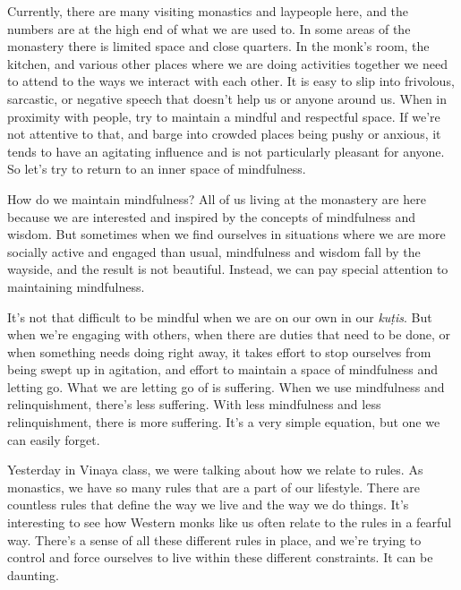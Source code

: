 
Currently, there are many visiting monastics and laypeople here, and 
the numbers are at the high end of what we are used to. In some areas 
of the monastery there is limited space and close quarters. In the 
monk's room, the kitchen, and various other places where we are doing 
activities together we need to attend to the ways we interact with each 
other. It is easy to slip into frivolous, sarcastic, or negative speech 
that doesn't help us or anyone around us. When in proximity with 
people, try to maintain a mindful and respectful space. If we're not 
attentive to that, and barge into crowded places being pushy or 
anxious, it tends to have an agitating influence and is not 
particularly pleasant for anyone. So let's try to return to an inner 
space of mindfulness.

How do we maintain mindfulness? All of us living at the monastery are 
here because we are interested and inspired by the concepts of 
mindfulness and wisdom. But sometimes when we find ourselves in 
situations where we are more socially active and engaged than usual, 
mindfulness and wisdom fall by the wayside, and the result is not 
beautiful. Instead, we can pay special attention to maintaining 
mindfulness.

It's not that difficult to be mindful when we are on our own in our 
\emph{kuṭis}. But when we're engaging with others, when there are 
duties that need to be done, or when something needs doing right away, 
it takes effort to stop ourselves from being swept up in agitation, and 
effort to maintain a space of mindfulness and letting go. What we are 
letting go of is suffering. When we use mindfulness and relinquishment, 
there's less suffering. With less mindfulness and less relinquishment, 
there is more suffering. It's a very simple equation, but one we can 
easily forget.


Yesterday in Vinaya class, we were talking about how we relate to 
rules. As monastics, we have so many rules that are a part of our 
lifestyle. There are countless rules that define the way we live and 
the way we do things. It's interesting to see how Western monks like us 
often relate to the rules in a fearful way. There's a sense of all 
these different rules in place, and we're trying to control and force 
ourselves to live within these different constraints. It can be 
daunting.

